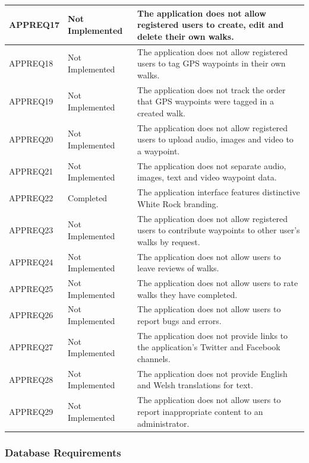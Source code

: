 \documentclass[11pt,a4paper]{article}
\begin{document}
\begin{longtable}{ p{}|p{}|p{} }
APPREQ17 & Not Implemented & The application does not allow registered users to create, edit and delete their own walks. \\ \hline
APPREQ18 & Not Implemented & The application does not allow registered users to tag GPS waypoints in their own walks. \\ \hline
APPREQ19 & Not Implemented & The application does not track the order that GPS waypoints were tagged in a created walk. \\ \hline
APPREQ20 & Not Implemented & The application does not allow registered users to upload audio, images and video to a waypoint. \\ \hline
APPREQ21 & Not Implemented & The application does not separate audio, images, text and video waypoint data. \\ \hline
APPREQ22 & Completed & The application interface features distinctive White Rock branding. \\ \hline
APPREQ23 & Not Implemented & The application does not allow registered users to contribute waypoints to other user's walks by request. \\ \hline
APPREQ24 & Not Implemented & The application does not allow users to leave reviews of walks. \\ \hline
APPREQ25 & Not Implemented & The application does not allow users to rate walks they have completed. \\ \hline
APPREQ26 & Not Implemented & The application does not allow users to report bugs and errors. \\ \hline
APPREQ27 & Not Implemented & The application does not provide links to the application's Twitter and Facebook channels. \\ \hline
APPREQ28 & Not Implemented & The application does not provide English and Welsh translations for text. \\ \hline
APPREQ29 & Not Implemented & The application does not allow users to report inappropriate content to an administrator. \\ \hline
\end{longtable}

\subsubsection{Database Requirements}
\label{sec:db-reqs}
\end{document}
